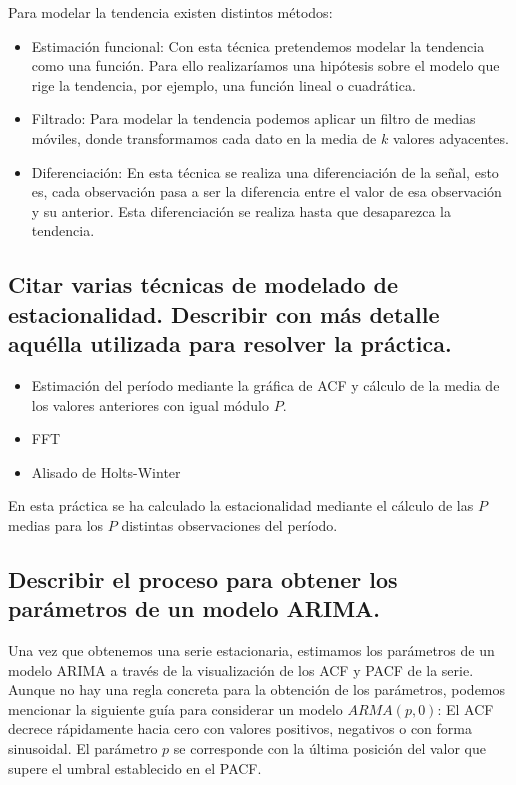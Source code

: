 \documentclass[11pt]{article}
\begin{document}
Para modelar la tendencia existen distintos métodos:
\begin{itemize}
\item Estimación funcional: Con esta técnica pretendemos modelar la
tendencia como una función. Para ello realizaríamos una hipótesis
sobre el modelo que rige la tendencia, por ejemplo, una función
lineal o cuadrática.
\item Filtrado: Para modelar la tendencia podemos aplicar un filtro de
medias móviles, donde transformamos cada dato en la media de \(k\)
valores adyacentes.
\item Diferenciación: En esta técnica se realiza una diferenciación de la
señal, esto es, cada observación pasa a ser la diferencia entre el
valor de esa observación y su anterior. Esta diferenciación se
realiza hasta que desaparezca la tendencia.
\end{itemize}

\subsection{Citar varias técnicas de modelado de estacionalidad.  Describir con más detalle aquélla utilizada para resolver la práctica.}
\label{sec:org2b682e0}
\begin{itemize}
\item Estimación del período mediante la gráfica de ACF y cálculo de la
media de los valores anteriores con igual módulo \(P\).
\item FFT
\item Alisado de Holts-Winter
\end{itemize}

En esta práctica se ha calculado la estacionalidad mediante el cálculo
de las \(P\) medias para los \(P\) distintas observaciones del período. 

\subsection{Describir el proceso para obtener los parámetros de un modelo ARIMA.}
\label{sec:org7d91def}

Una vez que obtenemos una serie estacionaria, estimamos los parámetros
de un modelo ARIMA a través de la visualización de los ACF y PACF de
la serie. Aunque no hay una regla concreta para la obtención de los
parámetros, podemos mencionar la siguiente guía para considerar un
modelo \(ARMA(p,0)\): El ACF decrece rápidamente hacia cero con valores
positivos, negativos o con forma sinusoidal. El parámetro \(p\) se
corresponde con la última posición del valor que supere el umbral
establecido en el PACF.
\end{document}
